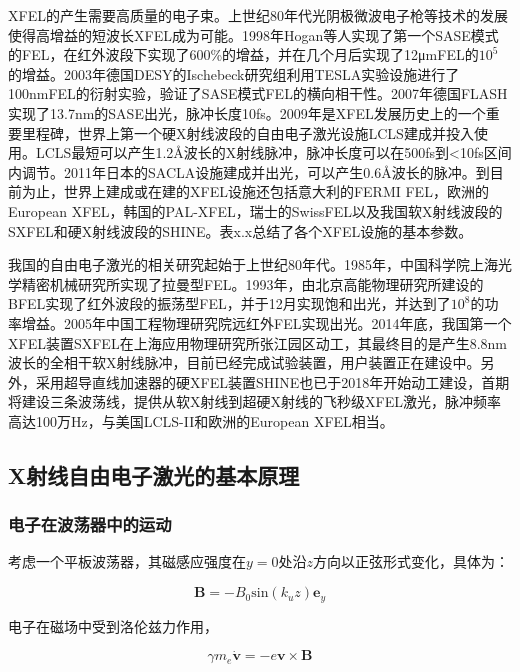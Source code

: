 XFEL的产生需要高质量的电子束。上世纪80年代光阴极微波电子枪等技术的发展使得高增益的短波长XFEL成为可能。1998年Hogan等人实现了第一个SASE模式的FEL，在红外波段下实现了600\%的增益\cite{hogan1998measurements1}，并在几个月后实现了12μmFEL的$10^5$的增益\cite{hogan1998measurements2}。2003年德国DESY的Ischebeck研究组利用TESLA实验设施进行了100nmFEL的衍射实验，验证了SASE模式FEL的横向相干性\cite{ischebeck2003study}。2007年德国FLASH实现了13.7nm的SASE出光，脉冲长度10fs\cite{ackermann2007operation}。2009年是XFEL发展历史上的一个重要里程碑，世界上第一个硬X射线波段的自由电子激光设施LCLS建成并投入使用\cite{emma2010first}。LCLS最短可以产生1.2Å波长的X射线脉冲，脉冲长度可以在500fs到<10fs区间内调节。2011年日本的SACLA设施建成并出光，可以产生0.6Å波长的脉冲\cite{pile2011x}。到目前为止，世界上建成或在建的XFEL设施还包括意大利的FERMI FEL，欧洲的European XFEL，韩国的PAL-XFEL，瑞士的SwissFEL以及我国软X射线波段的SXFEL和硬X射线波段的SHINE。表x.x总结了各个XFEL设施的基本参数。

我国的自由电子激光的相关研究起始于上世纪80年代。1985年，中国科学院上海光学精密机械研究所实现了拉曼型FEL\cite{赵振堂47x}。1993年，由北京高能物理研究所建设的BFEL实现了红外波段的振荡型FEL，并于12月实现饱和出光，并达到了$10^8$的功率增益\cite{xie1995saturation}。2005年中国工程物理研究院远红外FEL实现出光\cite{li2005first}。2014年底，我国第一个XFEL装置SXFEL\cite{zhao2016seeded}在上海应用物理研究所张江园区动工，其最终目的是产生8.8nm波长的全相干软X射线脉冲，目前已经完成试验装置，用户装置正在建设中。另外，采用超导直线加速器的硬XFEL装置SHINE\cite{zhao2018sclf}也已于2018年开始动工建设，首期将建设三条波荡线，提供从软X射线到超硬X射线的飞秒级XFEL激光，脉冲频率高达100万Hz，与美国LCLS-II和欧洲的European XFEL相当。

\subsection{X射线自由电子激光的基本原理}
\subsubsection{电子在波荡器中的运动}

考虑一个平板波荡器，其磁感应强度在$y=0$处沿$z$方向以正弦形式变化，具体为：

\begin{equation}
\bm{B} = -B_{0}\text{sin}(k_{u}z) \bm{e}_{y}
\end{equation}

电子在磁场中受到洛伦兹力作用，

\begin{equation}
\gamma m_{e} \dot{\bm{v}} = - e \bm{v} \times \bm{B}
\end{equation}

